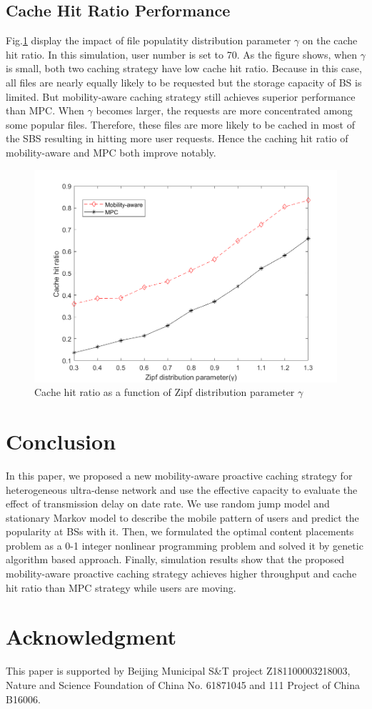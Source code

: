 \documentclass[conference]{IEEEtran}
\begin{document}
\subsection{Cache Hit Ratio Performance}
Fig.\ref{fig 5} display the impact of file populatity distribution parameter $\gamma$ on the cache hit ratio. In this simulation, user number is set to 70. As the figure shows, when $\gamma$is small, both two caching strategy have low cache hit ratio. Because in this case, all files are nearly equally likely to be requested but the storage capacity of BS is limited. But mobility-aware caching strategy still achieves superior performance than MPC. When $\gamma$ becomes larger, the requests are more concentrated among some popular files. Therefore, these files are more likely to be cached in most of the SBS resulting in hitting more user requests. Hence the caching hit ratio of mobility-aware and MPC both improve notably.
\begin{figure}[htbp]
 \centerline{\includegraphics[scale=0.3]{fig5.png}}
 \caption{Cache hit ratio as a function of Zipf distribution parameter $\gamma$ }
 \label{fig 5}
\end{figure}
\section{Conclusion}

In this paper, we proposed a new mobility-aware proactive caching strategy for heterogeneous ultra-dense network and use the effective capacity to evaluate the effect of transmission delay on date rate. We use random jump model and stationary Markov model to describe the mobile pattern of users and predict the popularity at BSs with it. Then, we formulated the optimal content placements problem as a 0-1 integer nonlinear programming problem and solved it by genetic algorithm based approach. Finally, simulation results show that the proposed mobility-aware proactive caching strategy achieves higher throughput and cache hit ratio than MPC strategy while users are moving.

\section*{Acknowledgment}

This paper is supported by Beijing Municipal S\&T project Z181100003218003, Nature and Science Foundation of China No. 61871045 and 111 Project of China B16006.



\end{document}
